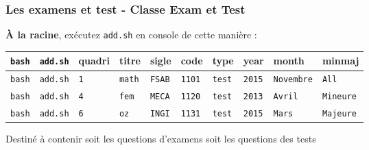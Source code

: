 \documentclass{beamer}
\begin{document}
\begin{frame}
    \frametitle{Les examens et test - Classe Exam et Test}
    \begin{exampleblock}{\textbf{À la racine}, exécutez \lstinline|add.sh| en
    console de cette manière :}
       \tiny \begin{tabular}{llllllllll}
           \lstinline[basicstyle=\rm\tiny\ttfamily]|bash| & \lstinline[basicstyle=\rm\tiny\ttfamily]|add.sh| & quadri & titre & sigle & code & type &
           year & month & minmaj \\
           \hline
	   \lstinline[basicstyle=\rm\tiny\ttfamily]|bash| &
	   \lstinline[basicstyle=\rm\tiny\ttfamily]|add.sh| &
	   \lstinline[basicstyle=\rm\tiny\ttfamily]|1| & \lstinline[basicstyle=\rm\tiny\ttfamily]|math|
	   & \lstinline[basicstyle=\rm\tiny\ttfamily]|FSAB| &
	   \lstinline[basicstyle=\rm\tiny\ttfamily]|1101| &
	   \lstinline[basicstyle=\rm\tiny\ttfamily]|test| &
	   \lstinline[basicstyle=\rm\tiny\ttfamily]|2015| &
	   \lstinline[basicstyle=\rm\tiny\ttfamily]|Novembre| &
	   \lstinline[basicstyle=\rm\tiny\ttfamily]|All| \\
	   \lstinline[basicstyle=\rm\tiny\ttfamily]|bash| &
	   \lstinline[basicstyle=\rm\tiny\ttfamily]|add.sh| &
	   \lstinline[basicstyle=\rm\tiny\ttfamily]|4| & \lstinline[basicstyle=\rm\tiny\ttfamily]|fem|
	   & \lstinline[basicstyle=\rm\tiny\ttfamily]|MECA| &
	   \lstinline[basicstyle=\rm\tiny\ttfamily]|1120| &
	   \lstinline[basicstyle=\rm\tiny\ttfamily]|test| &
	   \lstinline[basicstyle=\rm\tiny\ttfamily]|2013| &
	   \lstinline[basicstyle=\rm\tiny\ttfamily]|Avril| &
	   \lstinline[basicstyle=\rm\tiny\ttfamily]|Mineure| \\
	   \lstinline[basicstyle=\rm\tiny\ttfamily]|bash| &
	   \lstinline[basicstyle=\rm\tiny\ttfamily]|add.sh| &
	   \lstinline[basicstyle=\rm\tiny\ttfamily]|6| &
	   \lstinline[basicstyle=\rm\tiny\ttfamily]|oz| &
	   \lstinline[basicstyle=\rm\tiny\ttfamily]|INGI| &
	   \lstinline[basicstyle=\rm\tiny\ttfamily]|1131| &
	   \lstinline[basicstyle=\rm\tiny\ttfamily]|test| &
	   \lstinline[basicstyle=\rm\tiny\ttfamily]|2015| &
	   \lstinline[basicstyle=\rm\tiny\ttfamily]|Mars| &
	   \lstinline[basicstyle=\rm\tiny\ttfamily]|Majeure| \\
       \end{tabular}
    \end{exampleblock}
    Destiné à contenir soit les questions d'examens soit les
            questions des tests
\end{frame}
\end{document}
